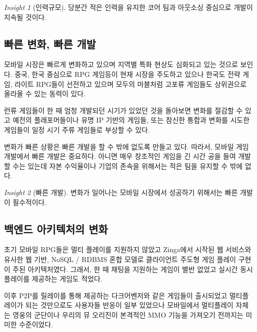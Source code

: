 \documentclass[ %
    a4paper,    %
    amsmath,    %
    itemph,     %
]{oblivoir}     %
\theoremstyle{definition}
\theoremstyle{remark}
\newtheorem{insight}{Insight}[section]
\theoremstyle{plain}
\begin{document}
\begin{tcolorbox}[colback=green!5,colframe=green!40!black,title=인력 규모]
\begin{insight}[인력규모]
  당분간 적은 인력을 유지한 코어 팀과 아웃소싱 중심으로 개발이 지속될 것이다.
\end{insight}
\end{tcolorbox}

\subsection{빠른 변화, 빠른 개발}
모바일 시장은 빠르게 변화하고 있으며 지역별 특화 현상도 심화되고 있는 것으로 보인다. 중국, 한국 중심으로
RPG 게임등이 현재 시장을 주도하고 있으나 한국도 전략 게임, 라이트 RPG들이 선전하고 있으며 모두의 마블처럼
고포류 게임들도 상위권으로 올라올 수 있는 동력이 있다.

런류 게임들이 한 때 엄청 개발되던 시기가 있었던 것을 돌아보면 변화를 절감할 수 있고
예전의 플래포머들이나 유명 IP 기반의 게임들, 또는 참신한 통합과 변화를 시도한 게임들이
일정 시기 주류 게임들로 부상할 수 있다.

변화가 빠른 상황은 빠른 개발을 할 수 밖에 없도록 만들고 있다. 따라서, 모바일 게임 개발에서 빠른 개발은 중요하다.
아니면 매우 창조적인 게임을 긴 시간 공을 들여 개발할 수는 있는데 자본 수익율이나 기업의 존속을 위해서는
적은 팀을 유지할 수 밖에 없다.

\begin{tcolorbox}[colback=green!5,colframe=green!40!black,title=빠른 개발]
\begin{insight}[빠른 개발]
  변화가 일어나는 모바일 시장에서 성공하기 위해서는 빠른 개발이 필수적이다.
\end{insight}
\end{tcolorbox}

\subsection{백엔드 아키텍처의 변화}
초기 모바일 RPG들은 멀티 플레이를 지원하지 않았고 Zinga에서 시작된 웹 서비스와 유사한
웹 기반, NoSQL / RDBMS 혼합 모델로 클라이언트 주도형 게임 플레이 구현이 주된 아키텍처였다.
그래서, 한 때 채팅을 지원하는 게임이 별반 없었고 실시간 동시 플레이를 제공하는 게임도 적었다.

이후 P2P를 릴레이를 통해 제공하는 다크어벤저와 같은 게임들이 출시되었고
멀티플레이가 되는 것만으로도 사용자들 반응이 일부 있었으나
모바일에서 멀티플레이 자체는 영웅의 군단이나 우리의 뮤 오리진이 본격적인 MMO 기능을 가져오기 전까지는
미미한 수준이었다.
\end{document}
